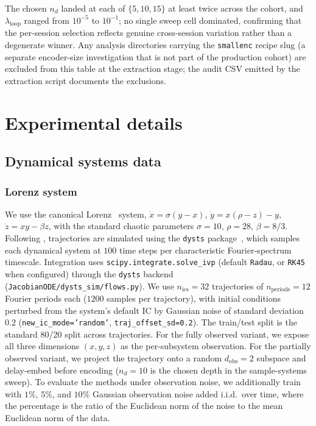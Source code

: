 \noindent The chosen $n_{d}$ landed at each of $\{5,10,15\}$ at least twice across the cohort, and $\lambda_{\mathrm{loop}}$ ranged from $10^{-5}$ to $10^{-1}$; no single sweep cell dominated, confirming that the per-session selection reflects genuine cross-session variation rather than a degenerate winner. Any analysis directories carrying the \texttt{smallenc} recipe slug (a separate encoder-size investigation that is not part of the production cohort) are excluded from this table at the extraction stage; the audit CSV emitted by the extraction script documents the exclusions.

\section{Experimental details}\label{supp:interareal-control-exp}

\subsection{Dynamical systems data}\label{supp:interareal-control-synth}

\subsubsection{Lorenz system}\label{supp:interareal-control-lorenz}

We use the canonical Lorenz~\cite{Lorenz1963-ho} system, $\dot{x}=\sigma(y-x)$, $\dot{y}=x(\rho-z)-y$, $\dot{z}=xy-\beta z$, with the standard chaotic parameters $\sigma=10$, $\rho=28$, $\beta=8/3$. Following \cite{Eisen2025-wt}, trajectories are simulated using the \texttt{dysts} package~\cite{Gilpin2021-rj}, which samples each dynamical system at $100$ time steps per characteristic Fourier-spectrum timescale. Integration uses \texttt{scipy.integrate.solve\_ivp} (default \texttt{Radau}, or \texttt{RK45} when configured) through the \texttt{dysts} backend (\texttt{JacobianODE/dysts\_sim/flows.py}). We use $n_{\mathrm{ics}}=32$ trajectories of $n_{\mathrm{periods}}=12$ Fourier periods each ($1200$ samples per trajectory), with initial conditions perturbed from the system's default IC by Gaussian noise of standard deviation $0.2$ (\texttt{new\_ic\_mode='random'}, \texttt{traj\_offset\_sd=0.2}). The train/test split is the standard 80/20 split across trajectories. For the fully observed variant, we expose all three dimensions $(x,y,z)$ as the per-subsystem observation. For the partially observed variant, we project the trajectory onto a random $d_{\mathrm{obs}}=2$ subspace and delay-embed before encoding ($n_{d}=10$ is the chosen depth in the sample-systems sweep). To evaluate the methods under observation noise, we additionally train with $1\%$, $5\%$, and $10\%$ Gaussian observation noise added i.i.d.\ over time, where the percentage is the ratio of the Euclidean norm of the noise to the mean Euclidean norm of the data.

